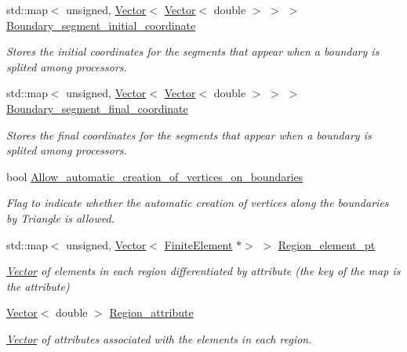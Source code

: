 \begin{DoxyCompactItemize}
std\+::map$<$ unsigned, \hyperlink{classoomph_1_1Vector}{Vector}$<$ \hyperlink{classoomph_1_1Vector}{Vector}$<$ double $>$ $>$ $>$ \hyperlink{classoomph_1_1UnstructuredTwoDMeshGeometryBase_a3010ddd2e1491f2c69db31a6e2031fbd}{Boundary\+\_\+segment\+\_\+initial\+\_\+coordinate}
\begin{DoxyCompactList}\small\item\em Stores the initial coordinates for the segments that appear when a boundary is splited among processors. \end{DoxyCompactList}\item 
std\+::map$<$ unsigned, \hyperlink{classoomph_1_1Vector}{Vector}$<$ \hyperlink{classoomph_1_1Vector}{Vector}$<$ double $>$ $>$ $>$ \hyperlink{classoomph_1_1UnstructuredTwoDMeshGeometryBase_a5b6d5112a12d39e9ddd45b91c5fc7670}{Boundary\+\_\+segment\+\_\+final\+\_\+coordinate}
\begin{DoxyCompactList}\small\item\em Stores the final coordinates for the segments that appear when a boundary is splited among processors. \end{DoxyCompactList}\item 
bool \hyperlink{classoomph_1_1UnstructuredTwoDMeshGeometryBase_a76998de1646db8791b5c4935e9820577}{Allow\+\_\+automatic\+\_\+creation\+\_\+of\+\_\+vertices\+\_\+on\+\_\+boundaries}
\begin{DoxyCompactList}\small\item\em Flag to indicate whether the automatic creation of vertices along the boundaries by Triangle is allowed. \end{DoxyCompactList}\item 
std\+::map$<$ unsigned, \hyperlink{classoomph_1_1Vector}{Vector}$<$ \hyperlink{classoomph_1_1FiniteElement}{Finite\+Element} $\ast$$>$ $>$ \hyperlink{classoomph_1_1UnstructuredTwoDMeshGeometryBase_a409ca5d71a2010d3ab423726d8ca76aa}{Region\+\_\+element\+\_\+pt}
\begin{DoxyCompactList}\small\item\em \hyperlink{classoomph_1_1Vector}{Vector} of elements in each region differentiated by attribute (the key of the map is the attribute) \end{DoxyCompactList}\item 
\hyperlink{classoomph_1_1Vector}{Vector}$<$ double $>$ \hyperlink{classoomph_1_1UnstructuredTwoDMeshGeometryBase_a8f809ba6140c7d14c08dcefddd9674e3}{Region\+\_\+attribute}
\begin{DoxyCompactList}\small\item\em \hyperlink{classoomph_1_1Vector}{Vector} of attributes associated with the elements in each region. \end{DoxyCompactList}\item 
$$
\end{DoxyCompactItemize}
